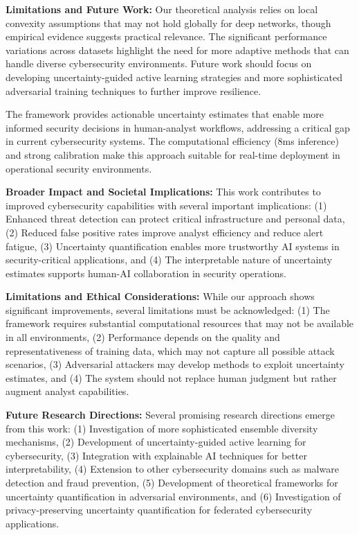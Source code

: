 \documentclass[journal]{IEEEtran}
\begin{document}
\textbf{Limitations and Future Work:} Our theoretical analysis relies on local convexity assumptions that may not hold globally for deep networks, though empirical evidence suggests practical relevance. The significant performance variations across datasets highlight the need for more adaptive methods that can handle diverse cybersecurity environments. Future work should focus on developing uncertainty-guided active learning strategies and more sophisticated adversarial training techniques to further improve resilience.

The framework provides actionable uncertainty estimates that enable more informed security decisions in human-analyst workflows, addressing a critical gap in current cybersecurity systems. The computational efficiency (8ms inference) and strong calibration make this approach suitable for real-time deployment in operational security environments.

\textbf{Broader Impact and Societal Implications:} This work contributes to improved cybersecurity capabilities with several important implications: (1) Enhanced threat detection can protect critical infrastructure and personal data, (2) Reduced false positive rates improve analyst efficiency and reduce alert fatigue, (3) Uncertainty quantification enables more trustworthy AI systems in security-critical applications, and (4) The interpretable nature of uncertainty estimates supports human-AI collaboration in security operations.

\textbf{Limitations and Ethical Considerations:} While our approach shows significant improvements, several limitations must be acknowledged: (1) The framework requires substantial computational resources that may not be available in all environments, (2) Performance depends on the quality and representativeness of training data, which may not capture all possible attack scenarios, (3) Adversarial attackers may develop methods to exploit uncertainty estimates, and (4) The system should not replace human judgment but rather augment analyst capabilities.

\textbf{Future Research Directions:} Several promising research directions emerge from this work: (1) Investigation of more sophisticated ensemble diversity mechanisms, (2) Development of uncertainty-guided active learning for cybersecurity, (3) Integration with explainable AI techniques for better interpretability, (4) Extension to other cybersecurity domains such as malware detection and fraud prevention, (5) Development of theoretical frameworks for uncertainty quantification in adversarial environments, and (6) Investigation of privacy-preserving uncertainty quantification for federated cybersecurity applications.
\end{document}
